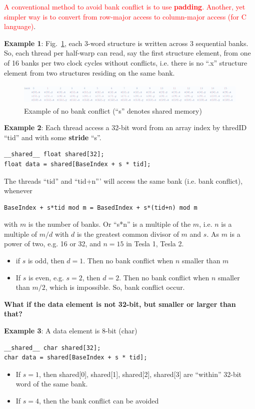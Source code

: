 \textcolor{red}{A conventional method to avoid bank conflict is to use
  {\bf padding}. Another, yet simpler way is to convert from row-major
  access to column-major access (for C language)}. 

{\bf Example 1}: Fig.~\ref{fig:bank_no_conflict}, each 3-word structure
is written across 3 sequential banks. So, each thread per half-warp
can read, say the first structure element,  from one of 16 banks per
two clock cycles without conflicts, i.e. there is no ``.x'' structure
element from two structures residing on the same bank.

\begin{figure}[hbt]
  \centerline{\includegraphics[height=1cm,
    angle=0]{./images/no_bank_conflict_2.eps}}
  \caption{Example of no bank conflict (``s'' denotes shared memory)}
  \label{fig:bank_no_conflict}
\end{figure}

{\bf Example 2}: Each thread access a 32-bit word from an array index by
thredID ``tid'' and with some {\bf stride} ``s''.
\begin{lstlisting}
__shared__ float shared[32];
float data = shared[BaseIndex + s * tid];
\end{lstlisting}
The threads ``tid'' and ``tid+n''' will access the same bank
(i.e. bank conflict), whenever
\begin{verbatim}
BaseIndex + s*tid mod m = BasedIndex + s*(tid+n) mod m
\end{verbatim}
with $m$ is the number of banks. Or ``s*n'' is a multiple of the $m$,
i.e. $n$ is a multiple of $m/d$ with $d$ is the greatest common
divisor of $m$ and $s$. As $m$ is a power of two, e.g. 16 or 32, and
$n=15$ in Tesla 1, Tesla 2.
\begin{itemize}
\item if $s$ is odd, then $d=1$. Then no bank conflict when $n$
  smaller than $m$
\item If $s$ is even, e.g. $s=2$, then $d=2$. Then no bank conflict
  when $n$ smaller than $m/2$, which is impossible. So, bank conflict
  occur.
\end{itemize}

{\bf What if the data element is not 32-bit, but smaller or larger
  than that?}

{\bf Example 3}: A data element is 8-bit (char)
\begin{lstlisting}
__shared__ char shared[32];
char data = shared[BaseIndex + s * tid];
\end{lstlisting}
\begin{itemize}
\item If $s=1$, then shared[0], shared[1], shared[2], shared[3] are
  ``within'' 32-bit word of the same bank. 
\item If $s=4$, then the bank conflict can be avoided
\end{itemize}

